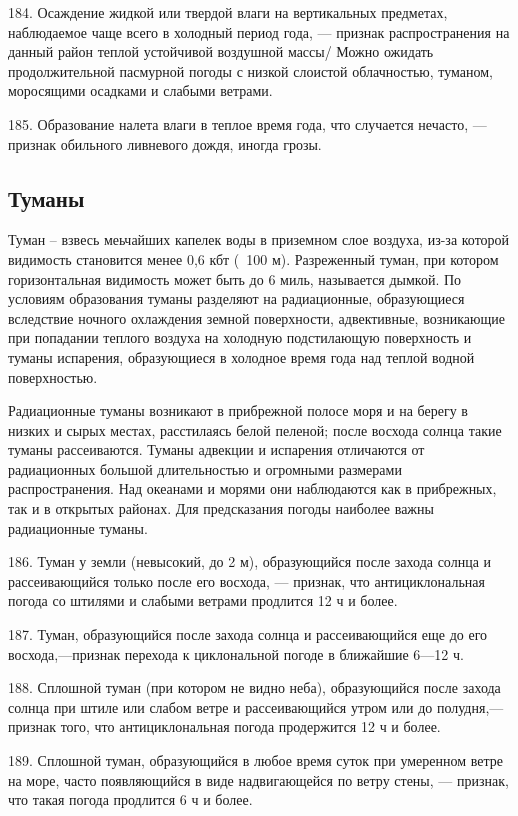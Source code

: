 184. Осаждение жидкой или твердой влаги на вертикальных предметах, наблюдаемое чаще всего в холодный период года, — признак распространения на данный район теплой устойчивой воздушной массы/ Можно ожидать продолжительной пасмурной погоды с низкой слоистой облачностью, туманом, моросящими осадками и слабыми ветрами.

185. Образование налета влаги в теплое время года, что случается нечасто, — признак обильного ливневого дождя, иногда грозы.

\subsection{Туманы}

Туман -- взвесь меьчайших капелек воды в приземном слое воздуха, из-за которой видимость становится менее 0,6 кбт (~100 м). Разреженный туман, при котором горизонтальная видимость может быть до 6 миль, называется дымкой. По условиям образования туманы разделяют на радиационные, образующиеся вследствие ночного охлаждения земной поверхности, адвективные, возникающие при попадании теплого воздуха на холодную подстилающую поверхность и туманы испарения, образующиеся в холодное время года над теплой водной поверхностью.

Радиационные туманы возникают в прибрежной полосе моря и на берегу в низких и сырых местах, расстилаясь белой пеленой; после восхода солнца такие туманы рассеиваются. Туманы адвекции и испарения отличаются от радиационных большой длительностью и огромными размерами распространения. Над океанами и морями они наблюдаются как в прибрежных, так и в открытых районах. Для предсказания погоды наиболее важны радиационные туманы.

186. Туман у земли (невысокий, до 2 м), образующийся после захода солнца и рассеивающийся только после его восхода, — признак, что антициклональная погода со штилями и слабыми ветрами продлится 12 ч и более.

187. Туман, образующийся после захода солнца и рассеивающийся еще до его восхода,—признак перехода к циклональной погоде в ближайшие 6—12 ч.

188. Сплошной туман (при котором не видно неба), образующийся после захода солнца при штиле или слабом ветре и рассеивающийся утром или до полудня,— признак того, что антициклональная погода продержится 12 ч и более.

189. Сплошной туман, образующийся в любое время суток при умеренном ветре на море, часто появляющийся в виде надвигающейся по ветру стены, — признак, что такая погода продлится 6 ч и более.

